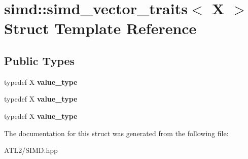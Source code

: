 \hypertarget{structsimd_1_1simd__vector__traits}{\section{simd\+:\+:simd\+\_\+vector\+\_\+traits$<$ X $>$ Struct Template Reference}
\label{structsimd_1_1simd__vector__traits}
}
\subsection*{Public Types}
\begin{DoxyCompactItemize}
\item 
\hypertarget{structsimd_1_1simd__vector__traits_a0d0534cdcc8411b796b37ec011e8953f}{typedef X {\bfseries value\+\_\+type}}\label{structsimd_1_1simd__vector__traits_a0d0534cdcc8411b796b37ec011e8953f}

\item 
\hypertarget{structsimd_1_1simd__vector__traits_a0d0534cdcc8411b796b37ec011e8953f}{typedef X {\bfseries value\+\_\+type}}\label{structsimd_1_1simd__vector__traits_a0d0534cdcc8411b796b37ec011e8953f}

\item 
\hypertarget{structsimd_1_1simd__vector__traits_a0d0534cdcc8411b796b37ec011e8953f}{typedef X {\bfseries value\+\_\+type}}\label{structsimd_1_1simd__vector__traits_a0d0534cdcc8411b796b37ec011e8953f}

\end{DoxyCompactItemize}


The documentation for this struct was generated from the following file\+:\begin{DoxyCompactItemize}
\item 
A\+T\+L2/S\+I\+M\+D.\+hpp\end{DoxyCompactItemize}

